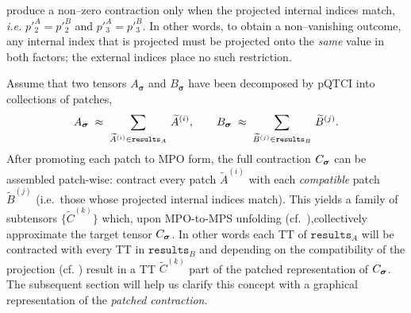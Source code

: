produce a non--zero contraction only when the projected internal indices match, \textit{i.e.} $p'^{A}_{2}=p'^{B}_{2}$ and $p'^{A}_{3}=p'^{B}_{3}$.  In other words, to obtain a non--vanishing outcome, any internal index that is projected must be projected onto the \emph{same} value in both factors; the external indices place no such restriction. 

Assume that two tensors \(A_{\boldsymbol{\sigma}}\) and
\(B_{\boldsymbol{\sigma}}\) have been decomposed by pQTCI into collections of
patches,
\begin{equation}
    \label{eq:patchCollectionsContr}
  A_{\boldsymbol{\sigma}}
    \;\approx\;
    \sum_{\widetilde{A}^{(i)}\in\texttt{results}_{A}}\,
        \widetilde{A}^{(i)},
  \qquad
  B_{\boldsymbol{\sigma}}
    \;\approx\;
    \sum_{\widetilde{B}^{(j)}\in\texttt{results}_{B}}\,
        \widetilde{B}^{(j)}.
\end{equation}
After promoting each patch to MPO form, the full contraction
\(C_{\boldsymbol{\sigma}}\) can be assembled patch-wise:
contract every patch \(\widetilde{A}^{(i)}\) with each \emph{compatible} patch \(\widetilde{B}^{(j)}\) (i.e.\ those whose projected internal indices match).  This yields a family of subtensors \(\{\widetilde{C}^{(k)}\}\) which, upon MPO-to-MPS unfolding (cf.\ ),collectively approximate the target tensor \(C_{\boldsymbol{\sigma}}\). In other words each TT of $\texttt{results}_{A}$ will be contracted with every TT in $\texttt{results}_{B}$ and depending on the compatibility of the projection (cf. ) result in a TT $\widetilde{C}^{(k)}$ part of the patched representation of \(C_{\boldsymbol{\sigma}}\). The subsequent section will help us clarify this concept with a graphical representation of the \textit{patched contraction}.


